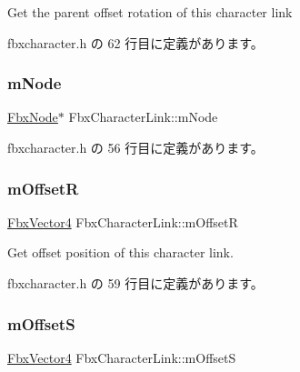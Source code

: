 Get the parent offset rotation of this character link 



 fbxcharacter.\+h の 62 行目に定義があります。

\mbox{\label{class_fbx_character_link_a1f8cdbd468b8bdb070ada229984c094e}} 
\subsubsection{\texorpdfstring{m\+Node}{mNode}}
{\footnotesize\ttfamily \hyperlink{class_fbx_node}{Fbx\+Node}$\ast$ Fbx\+Character\+Link\+::m\+Node}



 fbxcharacter.\+h の 56 行目に定義があります。

\mbox{\label{class_fbx_character_link_aab8ab2a895523dce65a76ea68a732960}} 
\subsubsection{\texorpdfstring{m\+OffsetR}{mOffsetR}}
{\footnotesize\ttfamily \hyperlink{class_fbx_vector4}{Fbx\+Vector4} Fbx\+Character\+Link\+::m\+OffsetR}



Get offset position of this character link. 



 fbxcharacter.\+h の 59 行目に定義があります。

\mbox{\label{class_fbx_character_link_acf71e4b7ea7b661ec5efa22a090e0a18}} 
\subsubsection{\texorpdfstring{m\+OffsetS}{mOffsetS}}
{\footnotesize\ttfamily \hyperlink{class_fbx_vector4}{Fbx\+Vector4} Fbx\+Character\+Link\+::m\+OffsetS}



